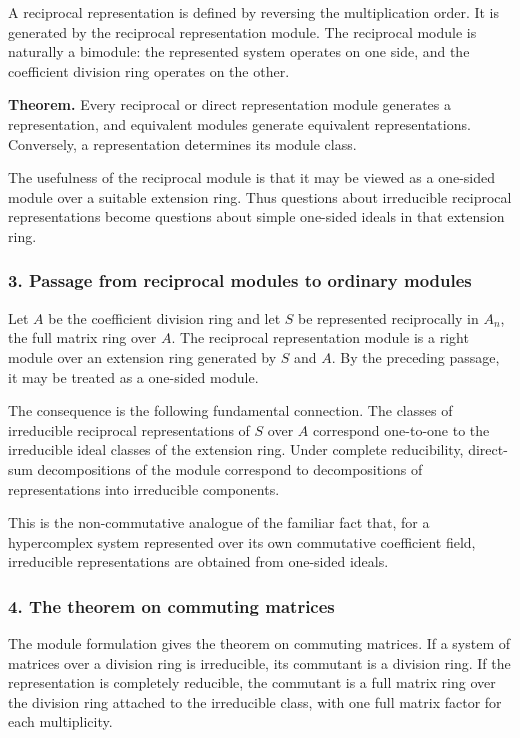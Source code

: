 \documentclass[11pt]{article}
\begin{document}
A reciprocal representation is defined by reversing the multiplication
order. It is generated by the reciprocal representation module. The
reciprocal module is naturally a bimodule: the represented system
operates on one side, and the coefficient division ring operates on the
other.

\textbf{Theorem.} Every reciprocal or direct representation module
generates a representation, and equivalent modules generate equivalent
representations. Conversely, a representation determines its module
class.

The usefulness of the reciprocal module is that it may be viewed as a
one-sided module over a suitable extension ring. Thus questions about
irreducible reciprocal representations become questions about simple
one-sided ideals in that extension ring.

\subsubsection{3. Passage from reciprocal modules to ordinary
modules}\label{passage-from-reciprocal-modules-to-ordinary-modules}

Let \(A\) be the coefficient division ring and let \(S\) be represented
reciprocally in \(A_n\), the full matrix ring over \(A\). The reciprocal
representation module is a right module over an extension ring generated
by \(S\) and \(A\). By the preceding passage, it may be treated as a
one-sided module.

The consequence is the following fundamental connection. The classes of
irreducible reciprocal representations of \(S\) over \(A\) correspond
one-to-one to the irreducible ideal classes of the extension ring. Under
complete reducibility, direct-sum decompositions of the module
correspond to decompositions of representations into irreducible
components.

This is the non-commutative analogue of the familiar fact that, for a
hypercomplex system represented over its own commutative coefficient
field, irreducible representations are obtained from one-sided ideals.

\subsubsection{4. The theorem on commuting
matrices}\label{the-theorem-on-commuting-matrices}

The module formulation gives the theorem on commuting matrices. If a
system of matrices over a division ring is irreducible, its commutant is
a division ring. If the representation is completely reducible, the
commutant is a full matrix ring over the division ring attached to the
irreducible class, with one full matrix factor for each multiplicity.
\end{document}
